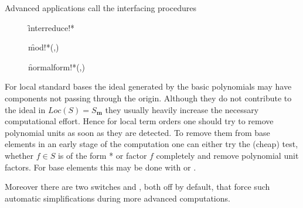 Advanced applications call the interfacing procedures
\begin{description}

\item[]
  \begin{syntax}
    \f{interreduce!*} 
  \end{syntax}
  \hypertarget{procedure:INTERREDUCE!*(}{}

\item[]
  \begin{syntax}
    \f{mod!*}(,)
  \end{syntax}
  \hypertarget{procedure:MOD!*}{}

\item[]
  \begin{syntax}
    \f{normalform!*}(,)
  \end{syntax}
  \hypertarget{procedure:NORMALFORM!*}{}
\end{description}

For local standard bases the ideal generated by the basic polynomials
may have components not passing through the origin. Although they do
not contribute to the ideal in $Loc(S)=S_{\mathbf{m}}$ they usually heavily
increase the necessary computational effort. Hence for local term
orders one should try to remove polynomial units as soon as they
are detected. To remove them from base elements in an early stage of
the computation one can either try the (cheap) test, whether $f\in S$
is of the form  *   or factor $f$ completely and remove polynomial unit
factors. For base elements this may be done with
 or .

Moreover there are two switches  and
, both off by default, that force such automatic
simplifications during more advanced computations.

